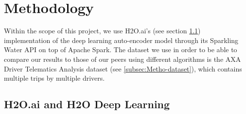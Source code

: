 \documentclass{vldb}
\begin{document}
\section{Methodology}
Within the scope of this project, we use H2O.ai's (see section \ref{subsec:Metho-h2o}) implementation of the deep learning auto-encoder model through its Sparkling Water API on top of Apache Spark. The dataset we use in order to be able to compare our results to those of our peers using different algorithms is the AXA Driver Telematics Analysis dataset (see \ref{subsec:Metho-dataset}), which contains multiple trips by multiple drivers.



\subsection{H2O.ai  and H2O Deep Learning}
\label{subsec:Metho-h2o}
\end{document}

